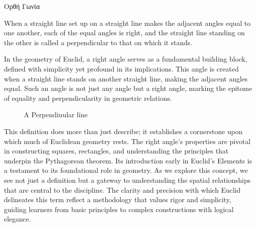 
\begin{defin}
\textgreek{Ορθή Γωνία}

When a straight line set up on a straight line makes the adjacent angles equal to one another, each of the equal angles is right, and the straight line standing on the other is called a perpendicular to that on which it stands.
\end{defin}

In the geometry of Euclid, a right angle serves as a fundamental building block, defined with simplicity yet profound in its implications. This angle is created when a straight line stands on another straight line, making the adjacent angles equal. Such an angle is not just any angle but a right angle, marking the epitome of equality and perpendicularity in geometric relations.

\begin{figure}[H]
	\centering
	\caption{A Perpendiuular line}
\end{figure}

This definition does more than just describe; it establishes a cornerstone upon which much of Euclidean geometry rests. The right angle's properties are pivotal in constructing squares, rectangles, and understanding the principles that underpin the Pythagorean theorem. Its introduction early in Euclid's Elements is a testament to its foundational role in geometry. As we explore this concept, we see not just a definition but a gateway to understanding the spatial relationships that are central to the discipline. The clarity and precision with which Euclid delineates this term reflect a methodology that values rigor and simplicity, guiding learners from basic principles to complex constructions with logical elegance.